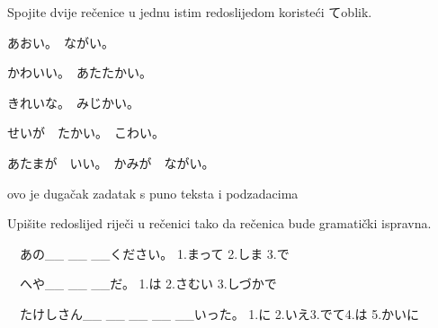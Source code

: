 

\author{Tomislav Mamić, Željka Ludošan}	%


	
	

	\begin{mondai}{Spojite dvije rečenice u jednu istim redoslijedom koristeći てoblik. 
		\begin{reibun}[Primjer:]
		\end{reibun} }

		\item あおい。　ながい。
		\item かわいい。　あたたかい。
		\item きれいな。　みじかい。
		\item せいが　たかい。　こわい。
		\item あたまが　いい。　かみが　ながい。　
		\item ovo je dugačak zadatak s puno teksta i podzadacima
		\vspace{-15pt} %
	\end{mondai}

	\begin{mondai}{Upišite redoslijed riječi u rečenici tako da rečenica bude gramatički ispravna. 
		\begin{reibun}[Primjer:]
		\end{reibun} }

		\item　あの\_\_ \_\_ \_\_ください。
		\vspace{10pt}
		\newline 1.まって 2.しま 3.で
		\vspace{20pt}
		\item　へや\_\_ \_\_ \_\_だ。
		\vspace{10pt}
		\newline 1.は 2.さむい 3.しづかで
		\vspace{20pt}
		\item　たけしさん\_\_ \_\_ \_\_ \_\_ \_\_いった。
		\vspace{10pt}
		\newline 1.に 2.いえ3.でて4.は 5.かいに
	\end{mondai}

